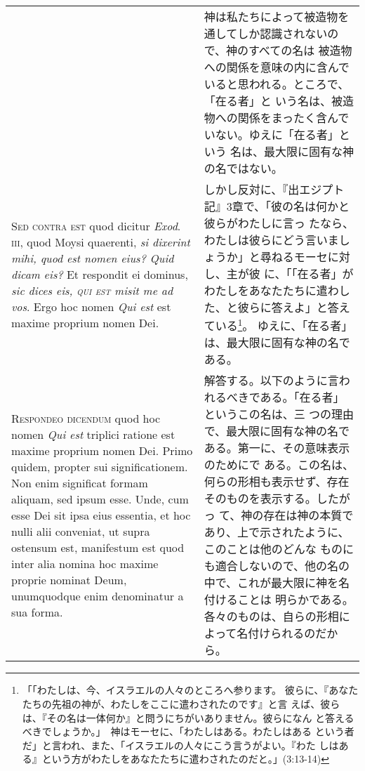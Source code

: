 \documentclass[paper=a4paper,fontsize=10pt,jafontsize=9pt,titlepage]{jlreq}
\begin{document}
\begin{longtable}{p{21em}p{21em}}
&

神は私たちによって被造物を通してしか認識されないので、神のすべての名は
被造物への関係を意味の内に含んでいると思われる。ところで、「在る者」と
いう名は、被造物への関係をまったく含んでいない。ゆえに「在る者」という
名は、最大限に固有な神の名ではない。

\\

{\scshape Sed contra est} quod dicitur {\itshape Exod}.~{\scshape
iii}, quod Moysi quaerenti, {\itshape si dixerint mihi, quod est nomen
eius? Quid dicam eis?}  Et respondit ei dominus, {\itshape sic dices
eis, {\scshape qui est} misit me ad vos}. Ergo hoc nomen {\itshape Qui
est} est maxime proprium nomen Dei.

&

しかし反対に、『出エジプト記』3章で、「彼の名は何かと彼らがわたしに言っ
たなら、わたしは彼らにどう言いましょうか」と尋ねるモーセに対し、主が彼
に、「「在る者」がわたしをあなたたちに遣わした、と彼らに答えよ」と答え
ている\footnote{「「わたしは、今、イスラエルの人々のところへ参ります。
彼らに、『あなたたちの先祖の神が、わたしをここに遣わされたのです』と言
えば、彼らは、『その名は一体何か』と問うにちがいありません。彼らになん
と答えるべきでしょうか。」　神はモーセに、「わたしはある。わたしはある
という者だ」と言われ、また、「イスラエルの人々にこう言うがよい。『わた
しはある』という方がわたしをあなたたちに遣わされたのだと。」(3:13-14)}。
ゆえに、「在る者」は、最大限に固有な神の名である。

\\

{\scshape Respondeo dicendum} quod hoc nomen {\itshape Qui est}
triplici ratione est maxime proprium nomen Dei. Primo quidem, propter
sui significationem. Non enim significat formam aliquam, sed ipsum
esse. Unde, cum esse Dei sit ipsa eius essentia, et hoc nulli alii
conveniat, ut supra ostensum est, manifestum est quod inter alia
nomina hoc maxime proprie nominat Deum, unumquodque enim denominatur a
sua forma.

&

解答する。以下のように言われるべきである。「在る者」というこの名は、三
つの理由で、最大限に固有な神の名である。第一に、その意味表示のためにで
ある。この名は、何らの形相も表示せず、存在そのものを表示する。したがっ
て、神の存在は神の本質であり、上で示されたように、このことは他のどんな
ものにも適合しないので、他の名の中で、これが最大限に神を名付けることは
明らかである。各々のものは、自らの形相によって名付けられるのだから。

\\


\end{longtable}
\end{document}
